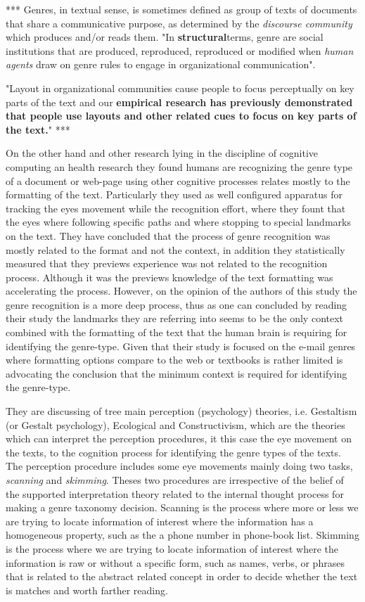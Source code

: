  ***
Genres, in textual sense, is sometimes defined as group of texts of documents that share a communicative purpose, as determined by the \textit{discourse community} which produces and/or reads them. "In \textbf{structural}terms, genre are social institutions that are produced, reproduced, reproduced or modified when \textit{human agents} draw on genre rules to engage in organizational communication".

"Layout in organizational communities cause people to focus perceptually on key parts of the text and our \textbf{empirical research has previously demonstrated that people use layouts and other related cues to focus on key parts of the text.}"
***


On the other hand and other research lying in the discipline of cognitive computing an health research they found humans are recognizing the genre type of a document or web-page using other cognitive processes relates mostly to the formatting of the text. Particularly they used as well configured apparatus for tracking the eyes movement while the recognition effort, where they fount that the eyes where following specific paths and where stopping to special landmarks on the text. They have concluded that the process of genre recognition was mostly related to the format and not the context, in addition they statistically measured that they previews experience was not related to the recognition process. Although it was the previews knowledge of the text formatting was accelerating the process. However, on the opinion of the authors of this study the genre recognition is a more deep process, thus as one can concluded by reading their study the landmarks they are referring into seems to be the only context combined with the formatting of the text that the human brain is requiring for identifying the genre-type. Given that their study is focused on the e-mail genres where formatting options compare to the web or textbooks is rather limited is advocating the conclusion that the minimum context is required for identifying the genre-type.

They are discussing of tree main perception (psychology) theories, i.e. Gestaltism (or Gestalt psychology), Ecological and Constructivism, which are the theories which can interpret the perception procedures, it this case the eye movement on the texts, to the cognition process for identifying the genre types of the texts. The perception procedure includes some eye movements mainly doing two tasks, \textit{scanning} and \textit{skimming}. Theses two procedures are irrespective of the belief of the supported interpretation theory related to the internal thought process for making a genre taxonomy decision. Scanning is the process where more or less we are trying to locate information of interest where the information has a homogeneous property, such as the a phone number in phone-book list. Skimming is the process where we are trying to locate information of interest where the information is raw or without a specific form, such as names, verbs, or phrases that is related to the abstract related concept in order to decide whether the text is matches and worth farther reading. 

